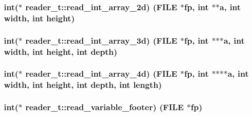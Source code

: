 \subsubsection[{\texorpdfstring{read\+\_\+int\+\_\+array\+\_\+2d}{read_int_array_2d}}]{\setlength{\rightskip}{0pt plus 5cm}int($\ast$ reader\+\_\+t\+::read\+\_\+int\+\_\+array\+\_\+2d) (F\+I\+LE $\ast$fp, int $\ast$$\ast$a, int width, int height)}\hypertarget{structreader__t_a1aa8bab71fe8c1026d7130e153b66052}{}\label{structreader__t_a1aa8bab71fe8c1026d7130e153b66052}
\subsubsection[{\texorpdfstring{read\+\_\+int\+\_\+array\+\_\+3d}{read_int_array_3d}}]{\setlength{\rightskip}{0pt plus 5cm}int($\ast$ reader\+\_\+t\+::read\+\_\+int\+\_\+array\+\_\+3d) (F\+I\+LE $\ast$fp, int $\ast$$\ast$$\ast$a, int width, int height, int depth)}\hypertarget{structreader__t_a2e8bb1ae1cdf7fa4324cefda05735f1f}{}\label{structreader__t_a2e8bb1ae1cdf7fa4324cefda05735f1f}
\subsubsection[{\texorpdfstring{read\+\_\+int\+\_\+array\+\_\+4d}{read_int_array_4d}}]{\setlength{\rightskip}{0pt plus 5cm}int($\ast$ reader\+\_\+t\+::read\+\_\+int\+\_\+array\+\_\+4d) (F\+I\+LE $\ast$fp, int $\ast$$\ast$$\ast$$\ast$a, int width, int height, int depth, int length)}\hypertarget{structreader__t_a6c1249ce040b848da09adf8ced9fc941}{}\label{structreader__t_a6c1249ce040b848da09adf8ced9fc941}
\subsubsection[{\texorpdfstring{read\+\_\+variable\+\_\+footer}{read_variable_footer}}]{\setlength{\rightskip}{0pt plus 5cm}int($\ast$ reader\+\_\+t\+::read\+\_\+variable\+\_\+footer) (F\+I\+LE $\ast$fp)}\hypertarget{structreader__t_a1c19dbd8f200b8f8d519e1b21861e0ef}{}\label{structreader__t_a1c19dbd8f200b8f8d519e1b21861e0ef}

